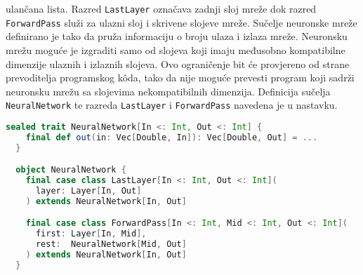 ulančana lista. Razred \texttt{LastLayer} označava zadnji sloj mreže dok razred \texttt{ForwardPass} služi za ulazni
sloj i skrivene slojeve mreže. Sučelje neuronske mreže definirano je tako da pruža informaciju o broju ulaza i izlaza
mreže. Neuronsku mrežu moguće je izgraditi samo od slojeva koji imaju međusobno kompatibilne dimenzije ulaznih i
izlaznih slojeva. Ovo ograničenje bit će provjereno od strane prevoditelja programskog kôda, tako da nije moguće
prevesti program koji sadrži neuronsku mrežu sa slojevima nekompatibilnih dimenzija. Definicija sučelja
\texttt{NeuralNetwork} te razreda \texttt{LastLayer} i \texttt{ForwardPass} navedena je u nastavku.
\begin{lstlisting}[language=scala,label={lst:lstlisting7}]
  sealed trait NeuralNetwork[In <: Int, Out <: Int] {
    final def out(in: Vec[Double, In]): Vec[Double, Out] = ...
  }

  object NeuralNetwork {
    final case class LastLayer[In <: Int, Out <: Int](
      layer: Layer[In, Out]
    ) extends NeuralNetwork[In, Out]

    final case class ForwardPass[In <: Int, Mid <: Int, Out <: Int](
      first: Layer[In, Mid],
      rest:  NeuralNetwork[Mid, Out]
    ) extends NeuralNetwork[In, Out]
  }
\end{lstlisting}


